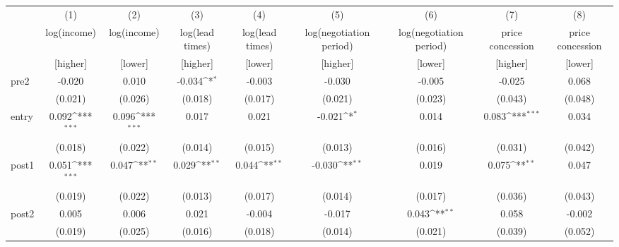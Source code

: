 {
\def\sym#1{\ifmmode^{#1}\else\(^{#1}\)\fi}
\begin{adjustbox}{max width=\textwidth}
\begin{tabular}{l*{8}{c}}
\toprule
            &\multicolumn{1}{c}{(1)}&\multicolumn{1}{c}{(2)}&\multicolumn{1}{c}{(3)}&\multicolumn{1}{c}{(4)}&\multicolumn{1}{c}{(5)}&\multicolumn{1}{c}{(6)}&\multicolumn{1}{c}{(7)}&\multicolumn{1}{c}{(8)}\\
            &\multicolumn{1}{c}{log(income)}&\multicolumn{1}{c}{log(income)}&\multicolumn{1}{c}{log(lead times)}&\multicolumn{1}{c}{log(lead times)}&\multicolumn{1}{c}{log(negotiation period)}&\multicolumn{1}{c}{log(negotiation period)}&\multicolumn{1}{c}{price concession}&\multicolumn{1}{c}{price concession}\\
&[higher]&[lower]&[higher]&[lower]&[higher]&[lower]&[higher]&[lower]\\
\midrule
pre2        &      -0.020         &       0.010         &      -0.034\sym{*}  &      -0.003         &      -0.030         &      -0.005         &      -0.025         &       0.068         \\
            &     (0.021)         &     (0.026)         &     (0.018)         &     (0.017)         &     (0.021)         &     (0.023)         &     (0.043)         &     (0.048)         \\
\addlinespace
entry       &       0.092\sym{***}&       0.096\sym{***}&       0.017         &       0.021         &      -0.021\sym{*}  &       0.014         &       0.083\sym{***}&       0.034         \\
            &     (0.018)         &     (0.022)         &     (0.014)         &     (0.015)         &     (0.013)         &     (0.016)         &     (0.031)         &     (0.042)         \\
\addlinespace
post1       &       0.051\sym{***}&       0.047\sym{**} &       0.029\sym{**} &       0.044\sym{**} &      -0.030\sym{**} &       0.019         &       0.075\sym{**} &       0.047         \\
            &     (0.019)         &     (0.022)         &     (0.013)         &     (0.017)         &     (0.014)         &     (0.017)         &     (0.036)         &     (0.043)         \\
\addlinespace
post2       &       0.005         &       0.006         &       0.021         &      -0.004         &      -0.017         &       0.043\sym{**} &       0.058         &      -0.002         \\
            &     (0.019)         &     (0.025)         &     (0.016)         &     (0.018)         &     (0.014)         &     (0.021)         &     (0.039)         &     (0.052)         \\

\end{tabular}
\end{adjustbox}}
